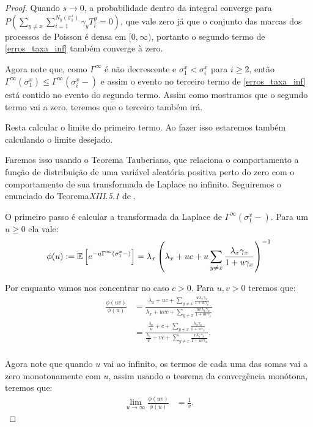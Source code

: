 \begin{proof}
  Quando $s \to 0$, a probabilidade dentro da integral converge para
  $P \left( \sum_{y \neq x} \sum_{i = 1}^{N_y (\sigma^x_1)} \gamma_y
    T^y_i = 0 \right)$, que vale zero já que o conjunto das marcas dos
  processos de Poisson é densa em $[0, \infty)$, portanto o segundo
  termo de \eqref{erros_taxa_inf} também converge à zero.


  Agora note que, como $\Gamma^\infty$ é não decrescente e $\sigma^x_1
  < \sigma^x_i$ para $i \geq 2$, então $\Gamma^\infty(\sigma^x_1) \leq
  \Gamma^\infty(\sigma^x_i -)$ e assim o evento no terceiro termo de
  \eqref{erros_taxa_inf} está contido no evento do segundo
  termo. Assim como mostramos que o segundo termo vai a zero, teremos
  que o terceiro também irá.

  Resta calcular o limite do primeiro termo. Ao fazer isso
  estaremos também calculando o limite desejado.

  Faremos isso usando o Teorema Tauberiano, que relaciona o
  comportamento a função de distribuição de uma variável aleatória
  positiva perto do zero com o comportamento de sua transformada de
  Laplace no infinito.  Seguiremos o enunciado do
  Teorema\emph{XIII.5.1} de \cite{fellerv2}.

  O primeiro passo é calcular a transformada da Laplace de
  $\Gamma^\infty(\sigma^x_1-)$. Para um $u \geq 0$ ela vale:
  \begin{align*}
    \phi (u) := {\mathbb{E}} \left[ e^{-u \Gamma^\infty (\sigma^x_1-)}  \right] =
    \lambda_x \left( \lambda_x + uc + u \sum_{y \neq x}
      \frac{\lambda_x \gamma_x}{1 + u\gamma_x}  \right)^{-1}
  \end{align*}

  Por enquanto vamos nos concentrar no caso $c > 0$. Para $u, v > 0$
  teremos que:
  \begin{align*}
    \frac{\phi(uv)}{\phi (u)} &= \frac{\lambda_x + uc + \sum_{y \neq
        x} \frac{u \lambda_x\gamma_x}{1 + u \gamma_x}} {\lambda_x + u
      v c + \sum_{y \neq x} \frac{u v
        \lambda_x\gamma_x}{1 + u v \gamma_x}} \\
    &= \frac{\frac{\lambda_x}{u} + c + \sum_{y \neq x}
      \frac{\lambda_x\gamma_x}{1 + u \gamma_x}} {\frac{\lambda_x}{u} +
      v c + \sum_{y \neq x} \frac{v
        \lambda_x\gamma_x}{1 + u v \gamma_x}}. \\
  \end{align*}

  Agora note que quando $u$ vai ao infinito, os termos de cada uma das
  somas vai a zero monotonamente com $u$, assim usando o teorema da
  convergência monótona, teremos que:
  \begin{align*}
      \lim_{u \to \infty} \frac{\phi(uv)}{\phi (u)} &= \frac{1}{v}.
  \end{align*}


\end{proof}
